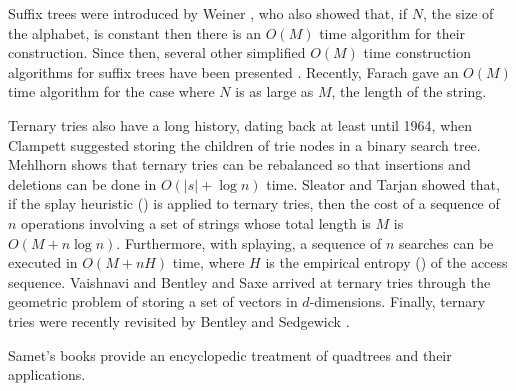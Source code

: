 Suffix trees were introduced by Weiner \cite{w73}, who also showed
that, if $N$, the size of the alphabet, is constant then there is an
$O(M)$ time algorithm for their construction.  Since then, several
other simplified $O(M)$ time construction algorithms for suffix trees
have been presented \cite{cs85,m76}.  Recently, Farach \cite{f97} gave
an $O(M)$ time algorithm for the case where $N$ is as large as $M$,
the length of the string.

Ternary tries also have a long history, dating back at least until
1964, when Clampett \cite{c64} suggested storing the children of trie
nodes in a binary search tree.  Mehlhorn \cite{m79} shows that ternary
tries can be rebalanced so that insertions and deletions can be done
in $O(|s|+\log n)$ time.  Sleator and Tarjan \cite{st85} showed that,
if the splay heuristic () is applied to ternary
tries, then the cost of a sequence of $n$ operations involving a set
of strings whose total length is $M$ is $O(M+n\log n)$.  Furthermore,
with splaying, a sequence of $n$ searches can be executed in $O(M+
nH)$ time, where $H$ is the empirical entropy () of
the access sequence.  Vaishnavi \cite{v84} and Bentley and Saxe
\cite{bs79} arrived at ternary tries through the geometric problem of
storing a set of vectors in $d$-dimensions.  Finally, ternary tries
were recently revisited by Bentley and Sedgewick \cite{bs97}.

Samet's books \cite{s90,sXX,sYY} provide an encyclopedic treatment of
quadtrees and their applications.


